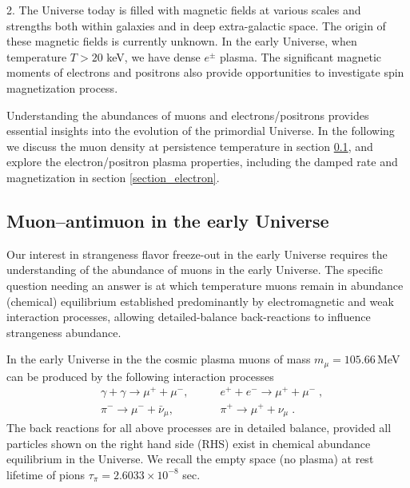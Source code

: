 2. The Universe today is filled with magnetic fields at various scales and strengths both within galaxies and in deep extra-galactic space. The origin of these magnetic fields is currently unknown. In the early Universe, when temperature $T>20$ keV, we have dense $e^\pm$ plasma. The significant magnetic moments of electrons and positrons also provide opportunities to investigate spin magnetization process.

Understanding the abundances of muons and electrons/positrons provides essential insights into the evolution of the primordial Universe.  In the following we discuss the muon density at persistence temperature in section \ref{section_muon}, and explore the electron/positron plasma properties, including the damped rate and magnetization in section \ref{section_electron}.


\subsection{Muon–antimuon in the early Universe}\label{section_muon}

Our interest in strangeness flavor freeze-out in the early Universe requires the understanding of the abundance of muons in the early Universe. The specific question needing an answer is at which temperature muons remain in abundance (chemical) equilibrium established predominantly by electromagnetic and weak interaction processes, allowing detailed-balance back-reactions to influence strangeness abundance.


In the early Universe in the the cosmic plasma muons of mass $m_\mu=105.66$\,MeV can be produced by the following interaction processes
\begin{align} 
&\gamma+\gamma\longrightarrow\mu^++\mu^-,\qquad & e^++e^-\longrightarrow \mu^++\mu^-\;,\\
&\pi^-\longrightarrow\mu^-+\bar{\nu}_\mu,\qquad & \pi^+\longrightarrow\mu^++\nu_\mu\;.
\end{align}
The back reactions for all above processes are in detailed balance, provided all particles shown on the right hand side (RHS) exist in chemical abundance equilibrium in the Universe. We recall the empty space (no plasma) at rest lifetime of pions $\tau_\pi=2.6033\times10^{-8}$ sec. 


